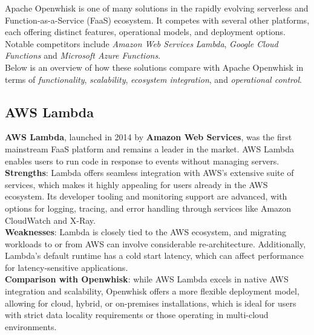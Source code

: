Apache Openwhisk is one of many solutions in the rapidly evolving serverless and Function-as-a-Service (FaaS) ecosystem. It competes with several other platforms, each offering distinct features, operational models, and deployment options.\vspace{14pt}\\
Notable competitors include \textit{Amazon Web Services} \textit{Lambda}, \textit{Google Cloud Functions} and \textit{Microsoft Azure Functions}.\\
Below is an overview of how these solutions compare with Apache Openwhisk in terms of \textit{functionality}, \textit{scalability}, \textit{ecosystem integration}, and \textit{operational control}.
\subsection{AWS Lambda}
\textbf{AWS Lambda}, launched in 2014 by \textbf{Amazon Web Services}, was the first mainstream FaaS platform and remains a leader in the market. AWS Lambda enables users to run code in response to events without managing servers.\vspace{14pt}\\
\textbf{Strengths}: Lambda offers seamless integration with AWS’s extensive suite of services, which makes it highly appealing for users already in the AWS ecosystem. Its developer tooling and monitoring support are advanced, with options for logging, tracing, and error handling through services like Amazon CloudWatch and X-Ray.\vspace{14pt}\\
\textbf{Weaknesses}: Lambda is closely tied to the AWS ecosystem, and migrating workloads to or from AWS can involve considerable re-architecture. Additionally, Lambda’s default runtime has a cold start latency, which can affect performance for latency-sensitive applications.\vspace{14pt}\\
\textbf{Comparison with Openwhisk}: while AWS Lambda excels in native AWS integration and scalability, Openwhisk offers a more flexible deployment model, allowing for cloud, hybrid, or on-premises installations, which is ideal for users with strict data locality requirements or those operating in multi-cloud environments.
